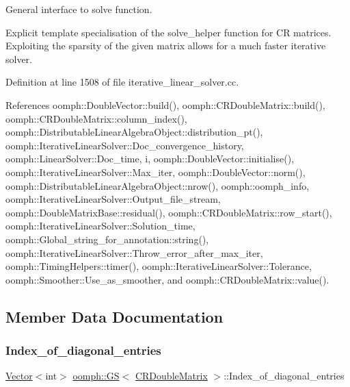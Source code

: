 General interface to solve function. 

Explicit template specialisation of the solve\+\_\+helper function for CR matrices. Exploiting the sparsity of the given matrix allows for a much faster iterative solver. 

Definition at line 1508 of file iterative\+\_\+linear\+\_\+solver.\+cc.



References oomph\+::\+Double\+Vector\+::build(), oomph\+::\+C\+R\+Double\+Matrix\+::build(), oomph\+::\+C\+R\+Double\+Matrix\+::column\+\_\+index(), oomph\+::\+Distributable\+Linear\+Algebra\+Object\+::distribution\+\_\+pt(), oomph\+::\+Iterative\+Linear\+Solver\+::\+Doc\+\_\+convergence\+\_\+history, oomph\+::\+Linear\+Solver\+::\+Doc\+\_\+time, i, oomph\+::\+Double\+Vector\+::initialise(), oomph\+::\+Iterative\+Linear\+Solver\+::\+Max\+\_\+iter, oomph\+::\+Double\+Vector\+::norm(), oomph\+::\+Distributable\+Linear\+Algebra\+Object\+::nrow(), oomph\+::oomph\+\_\+info, oomph\+::\+Iterative\+Linear\+Solver\+::\+Output\+\_\+file\+\_\+stream, oomph\+::\+Double\+Matrix\+Base\+::residual(), oomph\+::\+C\+R\+Double\+Matrix\+::row\+\_\+start(), oomph\+::\+Iterative\+Linear\+Solver\+::\+Solution\+\_\+time, oomph\+::\+Global\+\_\+string\+\_\+for\+\_\+annotation\+::string(), oomph\+::\+Iterative\+Linear\+Solver\+::\+Throw\+\_\+error\+\_\+after\+\_\+max\+\_\+iter, oomph\+::\+Timing\+Helpers\+::timer(), oomph\+::\+Iterative\+Linear\+Solver\+::\+Tolerance, oomph\+::\+Smoother\+::\+Use\+\_\+as\+\_\+smoother, and oomph\+::\+C\+R\+Double\+Matrix\+::value().



\subsection{Member Data Documentation}
\mbox{\label{classoomph_1_1GS_3_01CRDoubleMatrix_01_4_adb2dfc358598fe4492b4f6ac5c3371c2}} 
\subsubsection{\texorpdfstring{Index\+\_\+of\+\_\+diagonal\+\_\+entries}{Index\_of\_diagonal\_entries}}
{\footnotesize\ttfamily \hyperlink{classoomph_1_1Vector}{Vector}$<$int$>$ \hyperlink{classoomph_1_1GS}{oomph\+::\+GS}$<$ \hyperlink{classoomph_1_1CRDoubleMatrix}{C\+R\+Double\+Matrix} $>$\+::Index\+\_\+of\+\_\+diagonal\+\_\+entries\hspace{0.3cm}{\ttfamily [private]}}



